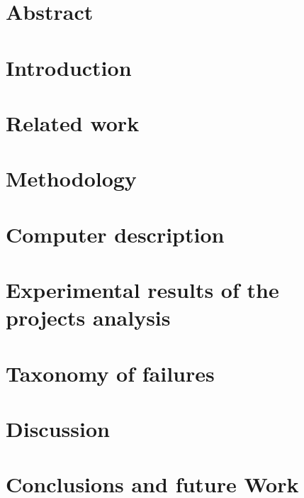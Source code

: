 \documentclass[11pt,a4paper,twoside]{book}
\begin{document}
\frontmatter





\chapter{Abstract}




\mainmatter
\restoreHeader

\chapter{Introduction}
\label{sec:intro} 
 

\chapter{Related work}
\label{sec:related}


\chapter{Methodology}
\label{sec:metodology}


\chapter{Computer description}
\label{sec:compdesc}


\chapter{Experimental results of the projects analysis}
\label{sec:results}


\chapter{Taxonomy of failures}
\label{sec:taxonomy}


\chapter{Discussion}
\label{sec:discussion}


\chapter{Conclusions and future Work}
\label{sec:conclusions}


\backmatter

%
%



\end{document}
